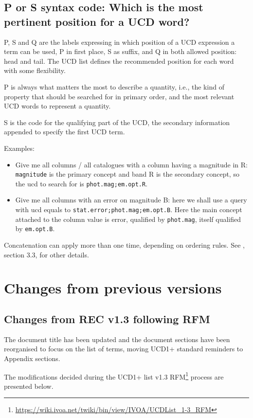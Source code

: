 \documentclass[11pt,a4paper]{ivoa}
\begin{document}
\subsection{P or S syntax code: Which is the most pertinent position for a UCD word?}
P, S and Q are the labels expressing in which position of a UCD expression a term can be used, P 
in first place, S as suffix, and Q in both allowed position: head and tail. The UCD list defines 
the recommended position for each word with some flexibility.

P is always what matters the most to describe a quantity, i.e., the kind of property that should be 
searched for in primary order, and the most relevant UCD words to represent a quantity.

S is the code for the qualifying part of the UCD, the secondary information appended to specify 
the first UCD term.

Examples:
\begin{itemize}
\item Give me all columns / all catalogues with a column having a magnitude in R: {\tt magnitude} 
is the primary concept and band R is the secondary concept, so the ucd to search for is 
{\tt phot.mag;em.opt.R}.
\item Give me all columns with an error on magnitude B: here we shall use a query with ucd 
equals to {\tt stat.error;phot.mag;em.opt.B}. Here the main concept attached to the column 
value is error, qualified by {\tt phot.mag}, itself qualified by {\tt em.opt.B}.
\end{itemize}
Concatenation can apply more than one time, depending on ordering rules. See \citet{2005ivoa.spec.0819D}, section 3.3, 
for other details.


\section{Changes from previous versions}

\subsection{Changes from REC v1.3 following RFM}
The document title has been updated and the document sections have been reorganised to focus on 
the list of terms, moving UCD1+ standard reminders to Appendix sections. 

The modifications decided during the UCD1+ list v1.3 
RFM\footnote{\url{https://wiki.ivoa.net/twiki/bin/view/IVOA/UCDList_1-3_RFM}} process are presented below.
\end{document}
